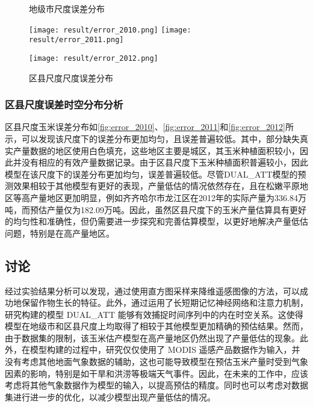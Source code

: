 \begin{figure}
  \centering
  \hfill
\end{figure}
\begin{figure}\ContinuedFloat
  \centering
  \caption{地级市尺度误差分布}
\end{figure}
\begin{figure}
  \centering
  {\texttt{[image: result/error\_2010.png]}}\hfill
  {\texttt{[image: result/error\_2011.png]}}
\end{figure}
\begin{figure}\ContinuedFloat
  \centering
  {\texttt{[image: result/error\_2012.png]}}
  \caption{区县尺度尺度误差分布}
\end{figure}

\subsubsection{区县尺度误差时空分布分析}
\par 区县尺度玉米误差分布如\autoref{fig:error_2010}、\autoref{fig:error_2011}和\autoref{fig:error_2012}所示，可以发现该尺度下的误差分布更加均匀，且误差普遍较低。其中，部分缺失真实产量数据的地区使用白色填充，这些地区主要是城区，其玉米种植面积较小，因此并没有相应的有效产量数据记录。由于区县尺度下玉米种植面积普遍较小，因此模型在该尺度下的误差分布更加均匀，误差普遍较低。尽管DUAL\_ATT模型的预测效果相较于其他模型有更好的表现，产量低估的情况依然存在，且在松嫩平原地区等高产量地区更加明显，例如齐齐哈尔市龙江区在2012年的实际产量为336.84万吨，而预估产量仅为182.09万吨。因此，虽然区县尺度下的玉米产量估算具有更好的均匀性和准确性，但仍需要进一步探究和完善估算模型，以更好地解决产量低估问题，特别是在高产量地区。

\subsection{讨论}
\par 经过实验结果分析可以发现，通过使用直方图采样来降维遥感图像的方法，可以成功地保留作物生长的特征。此外，通过运用了长短期记忆神经网络和注意力机制，研究构建的模型 DUAL\_ATT 能够有效捕捉时间序列中的内在时空关系。这使得模型在地级市和区县尺度上均取得了相较于其他模型更加精确的预估结果。然而，由于数据集的限制，该玉米估产模型在高产量地区仍然出现了产量低估的现象。此外，在模型构建的过程中，研究仅仅使用了 MODIS 遥感产品数据作为输入，并没有考虑其他地面气象数据的辅助，这也可能导致模型在预估玉米产量时受到气象因素的影响，特别是如干旱和洪涝等极端天气事件。因此，在未来的工作中，应该考虑将其他气象数据作为模型的输入，以提高预估的精度。同时也可以考虑对数据集进行进一步的优化，以减少模型出现产量低估的情况。

